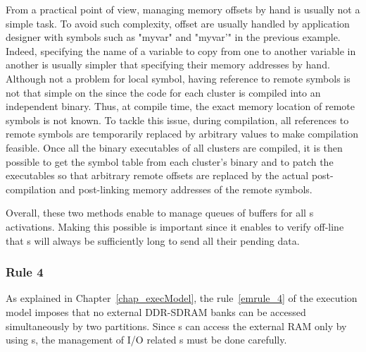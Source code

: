 \documentclass[main.tex]{subfiles}
\begin{document}
\begin{description}
        From a practical point of view, managing memory offsets by hand is usually not a simple task. To avoid such complexity, offset are usually handled by application designer with symbols such as "myvar" and "myvar'" in the previous example. Indeed, specifying the name of a variable to copy from one \PN{} to another variable in another \PN{} is usually simpler that specifying their memory addresses by hand. Although not a problem for local symbol, having reference to remote symbols is not that simple on the \mppalong since the code for each cluster is compiled into an independent binary. Thus, at compile time, the exact memory location of remote symbols is not known. To tackle this issue, during compilation, all references to remote symbols are temporarily replaced by arbitrary values to make compilation feasible. Once all the binary executables of all clusters are compiled, it is then possible to get the symbol table from each cluster's binary and to patch the executables so that arbitrary remote offsets are replaced by the actual post-compilation and post-linking memory addresses of the remote symbols. 
\end{description}

Overall, these two methods enable to manage queues of buffers for all \PC{}s activations. Making this possible is important since it enables to verify off-line that \PC{}s will always be sufficiently long to send all their pending data.

\subsubsection{Rule 4}
As explained in Chapter~\ref{chap_execModel}, the rule~\ref{emrule_4} of the execution model imposes that no external DDR-SDRAM banks can be accessed simultaneously by two partitions. Since \PN{}s can access the external RAM only by using \PC{}s, the management of I/O related \PC{}s must be done carefully.
\end{document}
